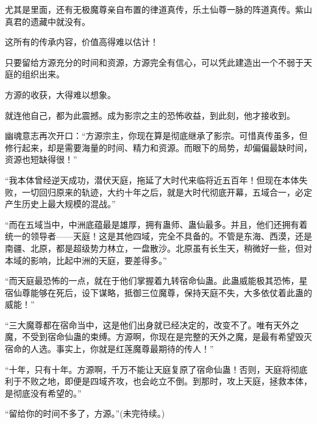\begin{this_body}
尤其是里面，还有无极魔尊亲自布置的律道真传，乐土仙尊一脉的阵道真传。紫山真君的遗藏中就没有。

这所有的传承内容，价值高得难以估计！

只要留给方源充分的时间和资源，方源完全有信心，可以凭此建造出一个不弱于天庭的组织出来。

方源的收获，大得难以想象。

就连他自己，都为此震撼。成为影宗之主的恐怖收益，到此刻，他才接收到。

幽魂意志再次开口：“方源宗主，你现在算是彻底继承了影宗。可惜真传虽多，但修行起来，却是需要海量的时间、精力和资源。而眼下的局势，却偏偏最缺时间，资源也短缺得很！”

“我本体曾经逆天成功，潜伏天庭，拖延了大时代来临将近五百年！但现在本体失败，一切回归原来的轨迹，大约十年之后，就是大时代彻底开幕，五域合一，必定产生历史上最大规模的混战。”

“而在五域当中，中洲底蕴最是雄厚，拥有蛊师、蛊仙最多。并且，他们还拥有着统一的领导者——天庭！这是其他四域，完全不具备的。不管是东海、西漠，还是南疆、北原，都是超级势力林立，一盘散沙。北原虽有长生天，稍微好一些，但对本域的影响，比起中洲的天庭，要差得多。”

“而天庭最恐怖的一点，就在于他们掌握着九转宿命仙蛊。此蛊威能极其恐怖，星宿仙尊能够在死后，设下谋略，抵御三位魔尊，保持天庭不失，大多依仗着此蛊的威能！”

“三大魔尊都在宿命当中，这是他们出身就已经决定的，改变不了。唯有天外之魔，不受到宿命仙蛊的束缚。方源啊，你现在是完整的天外之魔，是最有希望毁灭宿命的人选。事实上，你就是红莲魔尊最期待的传人！”

“十年，只有十年。方源啊，千万不能让天庭复原了宿命仙蛊！否则，天庭将彻底利于不败之地，即便是四域齐攻，也会屹立不倒。到那时，攻上天庭，拯救本体，是彻底没有希望的。”

“留给你的时间不多了，方源。”(未完待续。)

\end{this_body}

